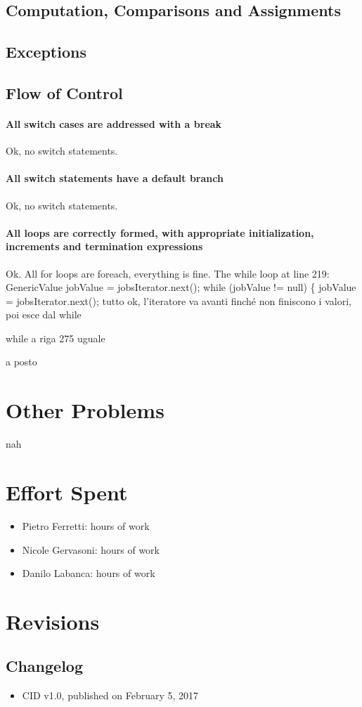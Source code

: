 \documentclass[english]{article}
\begin{document}
\subsection{Computation, Comparisons and Assignments}

\subsection{Exceptions}


\subsection{Flow of Control}
\paragraph{All switch cases are addressed with a break}
Ok, no switch statements.

\paragraph{All switch statements have a default branch}
Ok, no switch statements.

\paragraph{All loops are correctly formed, with appropriate initialization, increments and termination expressions}
Ok.
All for loops are foreach, everything is fine.
The while loop at line 219:
GenericValue jobValue = jobsIterator.next();
while (jobValue != null) \{
jobValue = jobsIterator.next();
tutto ok, l'iteratore va avanti finché non finiscono i valori, poi esce dal while

while a riga 275 uguale

a posto

\section{Other Problems} %
nah

\section{Effort Spent}
\begin{itemize}
	\item{Pietro Ferretti:  hours of work}
	\item{Nicole Gervasoni:  hours of work}
	\item{Danilo Labanca:  hours of work}
\end{itemize}


\section{Revisions}

\subsection{Changelog}
\begin{itemize}
	\item{CID v1.0, published on February 5, 2017}
\end{itemize}
\end{document}
